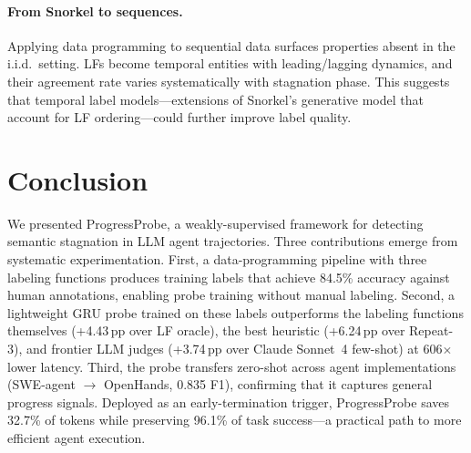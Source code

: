 \documentclass[11pt,a4paper]{article}
\begin{document}
\paragraph{From Snorkel to sequences.}
Applying data programming to sequential data surfaces properties absent in the i.i.d.\ setting.
LFs become temporal entities with leading/lagging dynamics, and their agreement rate varies systematically with stagnation phase.
This suggests that temporal label models---extensions of Snorkel's generative model that account for LF ordering---could further improve label quality.

\section{Conclusion}

We presented ProgressProbe, a weakly-supervised framework for detecting semantic stagnation in LLM agent trajectories.
Three contributions emerge from systematic experimentation.
First, a data-programming pipeline with three labeling functions produces training labels that achieve 84.5\% accuracy against human annotations, enabling probe training without manual labeling.
Second, a lightweight GRU probe trained on these labels outperforms the labeling functions themselves (+4.43\,pp over LF oracle), the best heuristic (+6.24\,pp over Repeat-3), and frontier LLM judges (+3.74\,pp over Claude Sonnet~4 few-shot) at 606$\times$ lower latency.
Third, the probe transfers zero-shot across agent implementations (SWE-agent $\to$ OpenHands, 0.835 F1), confirming that it captures general progress signals.
Deployed as an early-termination trigger, ProgressProbe saves 32.7\% of tokens while preserving 96.1\% of task success---a practical path to more efficient agent execution.
\end{document}
